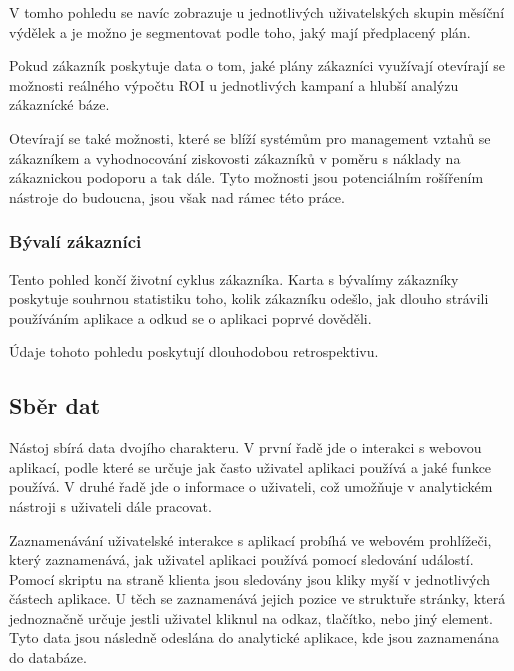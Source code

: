 \documentclass[bc,female,java,dept456]{diploma}						%
\begin{document}
V tomho pohledu se navíc zobrazuje u jednotlivých uživatelských skupin měsíční výdělek a je možno je segmentovat podle toho, jaký mají předplacený plán. 

Pokud zákazník poskytuje data o tom, jaké plány zákazníci využívají otevírají se možnosti reálného výpočtu ROI u jednotlivých kampaní a hlubší analýzu zákaznícké báze.

Otevírají se také možnosti, které se blíží systémům pro management vztahů se zákazníkem a vyhodnocování ziskovosti zákazníků v poměru s náklady na zákaznickou podoporu a tak dále. Tyto možnosti jsou potenciálním rošířením nástroje do budoucna, jsou však nad rámec této práce.


\subsubsection{Bývalí zákazníci}

Tento pohled končí životní cyklus zákazníka. Karta s bývalímy zákazníky poskytuje souhrnou statistiku toho, kolik zákazníku odešlo, jak dlouho strávili používáním aplikace a odkud se o aplikaci poprvé dověděli.

Údaje tohoto pohledu poskytují dlouhodobou retrospektivu.


\subsection{Sběr dat}

Nástoj sbírá data dvojího charakteru. V první řadě jde o interakci s webovou aplikací, podle které se určuje jak často uživatel aplikaci používá a jaké funkce používá. V druhé řadě jde o informace o uživateli, což umožňuje v analytickém nástroji s uživateli dále pracovat.

Zaznamenávání uživatelské interakce s aplikací probíhá ve webovém prohlížeči, který zaznamenává, jak uživatel aplikaci používá pomocí sledování událostí. Pomocí skriptu na straně klienta jsou sledovány jsou kliky myší v jednotlivých částech aplikace. U těch se zaznamenává jejich pozice ve struktuře stránky, která jednoznačně určuje jestli uživatel kliknul na odkaz, tlačítko, nebo jiný element. Tyto data jsou následně odeslána do analytické aplikace, kde jsou zaznamenána do databáze.

\bigskip
\end{document}
